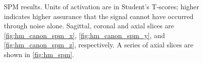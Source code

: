 \begin{figure}[H]
\caption{SPM results. Units of activation are in Student's T-scores; higher indicates higher 
        assurance that the signal cannot have occurred through noise alone. 
        Sagittal, coronal and axial slices  are 
        \autoref{fig:hm_canon_spm_x}, \autoref{fig:hm_canon_spm_y}, and
         \autoref{fig:hm_canon_spm_z}, respectively. A series of axial slices are
         shown in \autoref{fig:hm_spm}. }
\label{fig:hm_canon_spm}
\end{figure}

